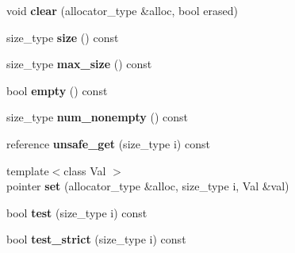 \begin{DoxyCompactItemize}
\item 
void {\bfseries clear} (allocator\+\_\+type \&alloc, bool erased)\hypertarget{classspp___1_1sparsegroup_a78f024cf443e698698fdcefa8b793b0a}{}\label{classspp___1_1sparsegroup_a78f024cf443e698698fdcefa8b793b0a}

\item 
size\+\_\+type {\bfseries size} () const \hypertarget{classspp___1_1sparsegroup_adc6026f854908015ac9cbdf532aac3dc}{}\label{classspp___1_1sparsegroup_adc6026f854908015ac9cbdf532aac3dc}

\item 
size\+\_\+type {\bfseries max\+\_\+size} () const \hypertarget{classspp___1_1sparsegroup_ab8e7bf5e51f1cc37a5c254fdeb425a8d}{}\label{classspp___1_1sparsegroup_ab8e7bf5e51f1cc37a5c254fdeb425a8d}

\item 
bool {\bfseries empty} () const \hypertarget{classspp___1_1sparsegroup_acfbd29ae80b8a104df238e1eb8cd1b2b}{}\label{classspp___1_1sparsegroup_acfbd29ae80b8a104df238e1eb8cd1b2b}

\item 
size\+\_\+type {\bfseries num\+\_\+nonempty} () const \hypertarget{classspp___1_1sparsegroup_a8a138e0cec9d7edcd33833487f869f44}{}\label{classspp___1_1sparsegroup_a8a138e0cec9d7edcd33833487f869f44}

\item 
reference {\bfseries unsafe\+\_\+get} (size\+\_\+type i) const \hypertarget{classspp___1_1sparsegroup_a6516b2e1f11e1f88ffde1b8751dced67}{}\label{classspp___1_1sparsegroup_a6516b2e1f11e1f88ffde1b8751dced67}

\item 
{\footnotesize template$<$class Val $>$ }\\pointer {\bfseries set} (allocator\+\_\+type \&alloc, size\+\_\+type i, Val \&val)\hypertarget{classspp___1_1sparsegroup_a9a89e1c2ad04d6e5075699cb4711cb39}{}\label{classspp___1_1sparsegroup_a9a89e1c2ad04d6e5075699cb4711cb39}

\item 
bool {\bfseries test} (size\+\_\+type i) const \hypertarget{classspp___1_1sparsegroup_adbc4b0c4e6feaa3e53e833176d02d10a}{}\label{classspp___1_1sparsegroup_adbc4b0c4e6feaa3e53e833176d02d10a}

\item 
bool {\bfseries test\+\_\+strict} (size\+\_\+type i) const \hypertarget{classspp___1_1sparsegroup_a52b04376d9725535ea1d6c817c349721}{}\label{classspp___1_1sparsegroup_a52b04376d9725535ea1d6c817c349721}


\end{DoxyCompactItemize}
